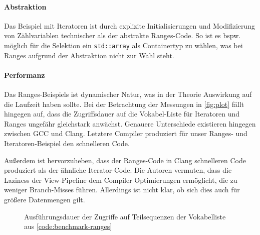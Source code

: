 \documentclass[runningheads]{llncs}
\begin{document}
\paragraph{Abstraktion}
Das Beispiel mit Iteratoren ist durch explizite Initialisierungen und Modifizierung von Zählvariablen technischer als der abstrakte Ranges-Code.
So ist es bspw. möglich für die Selektion ein \texttt{std::array} als Containertyp zu wählen, was bei Ranges aufgrund der Abstraktion nicht zur Wahl steht.

\paragraph{Performanz}

Das Ranges-Beispiels ist dynamischer Natur, was in der Theorie Auswirkung auf die Laufzeit haben sollte.
Bei der Betrachtung der Messungen in \autoref{fig:plot} fällt hingegen auf, dass die Zugriffsdauer auf die Vokabel-Liste für Iteratoren und Ranges ungefähr gleichstark anwächst.
Genauere Unterschiede existieren hingegen zwischen GCC und Clang.
Letztere Compiler produziert für unser Ranges- und Iteratoren-Beispiel den schnelleren Code.

Außerdem ist hervorzuheben, dass der Ranges-Code in Clang schnelleren Code produziert als der ähnliche Iterator-Code.
Die Autoren vermuten, dass die Laziness der View-Pipeline dem Compiler Optimierungen ermöglicht, die zu weniger Branch-Misses führen.
Allerdings ist nicht klar, ob sich dies auch für größere Datenmengen gilt.

\begin{figure}
	\caption{Ausführungsdauer der Zugriffe auf Teilsequenzen der Vokabelliste aus \ref{code:benchmark-ranges}}
	\label{fig:plot}

\end{figure}
\end{document}
